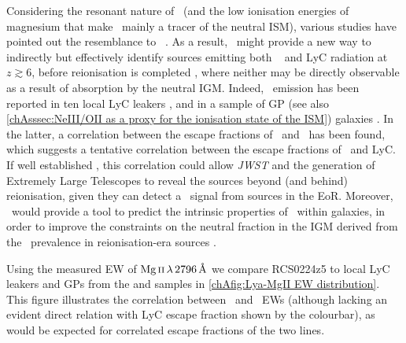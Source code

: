 Considering the resonant nature of \MgII\ (and the low ionisation energies of magnesium that make \MgII\ mainly a tracer of the neutral ISM), various studies have pointed out the resemblance to \lya\ \citep[e.g.][]{2018ApJ...855...96H, 2018A&A...617A..62F}. As a result, \MgII\ might provide a new way to indirectly but effectively identify sources emitting both \lya\ \citep[commonly used as a probe for measuring the conditions of the IGM, see][]{2014PASA...31...40D} and LyC radiation at $z \gtrsim 6$, before reionisation is completed \citep{2015MNRAS.447..499M}, where neither may be directly observable as a result of absorption by the neutral IGM. Indeed, \MgII\ emission has been reported in ten local LyC leakers \citep{2016MNRAS.461.3683I, 2016Natur.529..178I, 2018MNRAS.474.4514I, 2018MNRAS.478.4851I, 2020MNRAS.497.4293G}, and in a sample of GP (see also \cref{chAsssec:NeIII/OII as a proxy for the ionisation state of the ISM}) galaxies \citep{2018ApJ...855...96H}. In the latter, a correlation between the escape fractions of \MgII\ and \lya\ has been found, which suggests a tentative correlation between the escape fractions of \MgII\ and LyC. If well established \citep[promising first results have been reported,][]{2020MNRAS.498.2554C, 2021MNRAS.505.1382M}, this correlation could allow \textit{JWST} and the generation of Extremely Large Telescopes to reveal the sources beyond (and behind) reionisation, given they can detect a \MgII\ signal from sources in the EoR. Moreover, \MgII\ would provide a tool to predict the intrinsic properties of \lya\ within galaxies, in order to improve the constraints on the neutral fraction in the IGM derived from the \lya\ prevalence in reionisation-era sources \citep[e.g.][]{2014ApJ...795...20S, 2018ApJ...856....2M, 2018A&A...619A.147P}.

Using the measured EW of $\MgII \, \lambda \, 2796 \, \Angstrom$ we compare RCS0224z5 to local LyC leakers and GPs from the \citeauthor{2016Natur.529..178I} and \citeauthor{2018ApJ...855...96H} samples in \cref{chAfig:Lya-MgII EW distribution}. This figure illustrates the correlation between \lya\ and \MgII\ EWs (although lacking an evident direct relation with LyC escape fraction shown by the colourbar), as would be expected for correlated escape fractions of the two lines.

